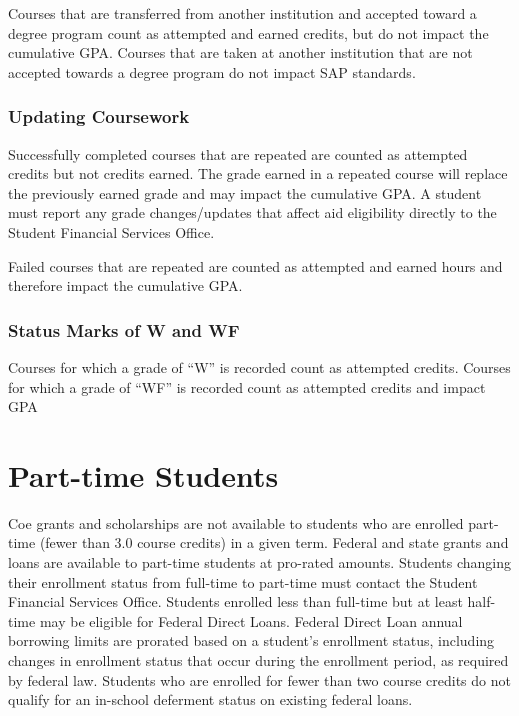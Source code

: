 \documentclass[
  letterpaper,
]{scrbook}
\begin{document}
Courses that are transferred from another institution and accepted
toward a degree program count as attempted and earned credits, but do
not impact the cumulative GPA. Courses that are taken at another
institution that are not accepted towards a degree program do not impact
SAP standards.

\subsubsection{\texorpdfstring{\textbf{Updating
Coursework}}{Updating Coursework}}\label{updating-coursework}

Successfully completed courses that are repeated are counted as
attempted credits but not credits earned. The grade earned in a repeated
course will replace the previously earned grade and may impact the
cumulative GPA. A student must report any grade changes/updates that
affect aid eligibility directly to the Student Financial Services
Office.

Failed courses that are repeated are counted as attempted and earned
hours and therefore impact the cumulative GPA.

\subsubsection{\texorpdfstring{\textbf{Status Marks of W and
WF}}{Status Marks of W and WF}}\label{status-marks-of-w-and-wf}

Courses for which a grade of ``W'' is recorded count as attempted
credits. Courses for which a grade of ``WF'' is recorded count as
attempted credits and impact GPA

\section{\texorpdfstring{\textbf{Part-time
Students}}{Part-time Students}}\label{part-time-students-1}

Coe grants and scholarships are not available to students who are
enrolled part-time (fewer than 3.0 course credits) in a given term.
Federal and state grants and loans are available to part-time students
at pro-rated amounts. Students changing their enrollment status from
full-time to part-time must contact the Student Financial Services
Office. Students enrolled less than full-time but at least half-time may
be eligible for Federal Direct Loans. Federal Direct Loan annual
borrowing limits are prorated based on a student's enrollment status,
including changes in enrollment status that occur during the enrollment
period, as required by federal law. Students who are enrolled for fewer
than two course credits do not qualify for an in-school deferment status
on existing federal loans.
\end{document}
